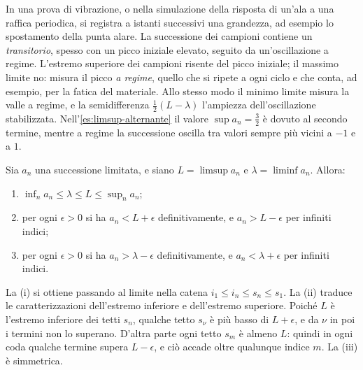 \begin{idea}
In una prova di vibrazione, o nella simulazione della risposta di un'ala a una raffica
periodica, si registra a istanti successivi una grandezza, ad esempio lo spostamento
della punta alare. La successione dei campioni contiene un \emph{transitorio}, spesso
con un picco iniziale elevato, seguito da un'oscillazione a regime. L'estremo superiore
dei campioni risente del picco iniziale; il massimo limite no: misura il picco \emph{a
regime}, quello che si ripete a ogni ciclo e che conta, ad esempio, per la fatica del
materiale. Allo stesso modo il minimo limite misura la valle a regime, e la semidifferenza
$\frac12(L-\lambda)$ l'ampiezza dell'oscillazione stabilizzata. Nell'\cref{es:limsup-alternante}
il valore $\sup a_{n}=\frac32$ è dovuto al secondo termine, mentre a regime la
successione oscilla tra valori sempre più vicini a $-1$ e a $1$.
\end{idea}

\begin{proposizione}\label{prop:limsup-proprieta}
Sia $a_{n}$ una successione limitata, e siano $L=\limsup a_{n}$ e $\lambda=\liminf a_{n}$.
Allora:
\begin{enumerate}
  \item $\inf_{n}a_{n}\le\lambda\le L\le\sup_{n}a_{n}$;
  \item per ogni $\epsilon>0$ si ha $a_{n}<L+\epsilon$ definitivamente, e
  $a_{n}>L-\epsilon$ per infiniti indici;
  \item per ogni $\epsilon>0$ si ha $a_{n}>\lambda-\epsilon$ definitivamente, e
  $a_{n}<\lambda+\epsilon$ per infiniti indici.
\end{enumerate}
\end{proposizione}

\begin{schema}
\end{schema}

\begin{strategia}
La (i) si ottiene passando al limite nella catena $i_{1}\le i_{n}\le s_{n}\le s_{1}$. La
(ii) traduce le caratterizzazioni dell'estremo inferiore e dell'estremo superiore.
Poiché $L$ è l'estremo inferiore dei tetti $s_{n}$, qualche tetto $s_{\nu}$ è più basso
di $L+\epsilon$, e da $\nu$ in poi i termini non lo superano. D'altra parte ogni tetto
$s_{m}$ è almeno $L$: quindi in ogni coda qualche termine supera $L-\epsilon$, e ciò
accade oltre qualunque indice $m$. La (iii) è simmetrica.
\end{strategia}

